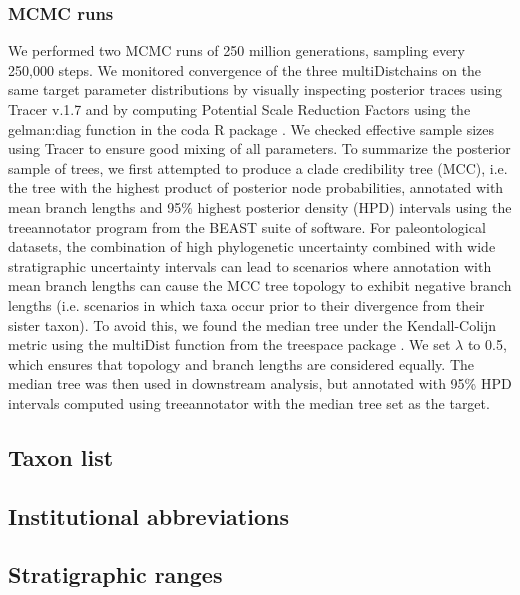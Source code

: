 \documentclass[a4paper, 12pt]{article}
\begin{document}
\begin{landscape}
\subsubsection{MCMC runs}

We performed two MCMC runs of 250 million generations, sampling every 250,000 steps. We monitored convergence of the three multiDistchains on the same target parameter distributions by visually inspecting posterior traces using Tracer v.1.7 and by computing Potential Scale Reduction Factors \citep{gelman1992inference} using the gelman:diag function in the coda R package \citep{plummer2006coda}. We checked effective sample sizes using Tracer to ensure good mixing of all parameters. To summarize the posterior sample of trees, we first attempted to produce a clade credibility tree (MCC), i.e. the tree with the highest product of posterior node probabilities, annotated with mean branch lengths and 95\% highest posterior density (HPD) intervals using the treeannotator program from the BEAST suite of software. For paleontological datasets, the combination of high phylogenetic uncertainty combined with wide stratigraphic uncertainty intervals can lead to scenarios where annotation with mean branch lengths can cause the MCC tree topology to exhibit negative branch lengths (i.e. scenarios in which taxa occur prior to their divergence from their sister taxon). To avoid this, we found the median tree under the Kendall-Colijn metric using the multiDist function from the treespace package \citep{jombart2017treespace}. We set $\lambda$ to 0.5, which ensures that topology and branch lengths are considered equally. The median tree was then used in downstream analysis, but annotated with 95\% HPD intervals computed using treeannotator with the median tree set as the target.    

\subsection{Taxon list}


\end{landscape}
\newpage
\subsection{Institutional abbreviations}

\newpage
\begin{landscape}
\subsection{Stratigraphic ranges}


\end{landscape}
 
\end{document}
